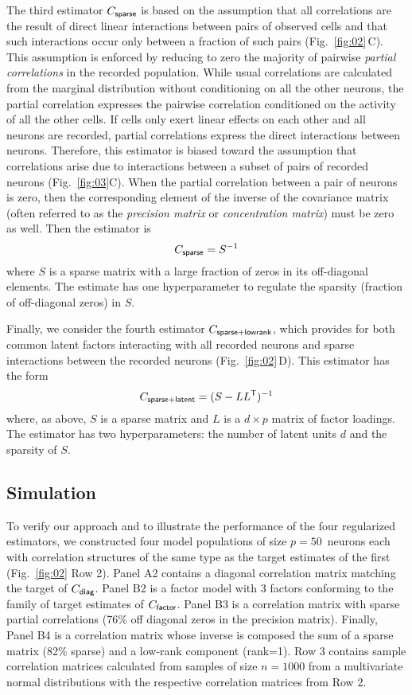 \documentclass[10pt]{article}
\newcommand{\T}{{\sf T}}
\begin{document}
The third estimator $C_{\sf sparse}$ is based on the assumption that all correlations are the result of direct linear interactions between pairs of observed cells and that such interactions occur only between a fraction of such pairs (Fig.~\ref{fig:02}\,C).
This assumption is enforced by reducing to zero the majority of pairwise \emph{partial correlations} in the recorded population. 
While usual correlations are calculated from the marginal distribution without conditioning on all the other neurons, the partial correlation expresses the pairwise correlation conditioned on the activity of all the other cells.  
If cells only exert linear effects on each other and all neurons are recorded, partial correlations express the direct interactions between neurons. 
Therefore, this estimator is biased toward the assumption that correlations arise due to interactions between a subset of pairs of recorded neurons (Fig.~\ref{fig:03}C). When the partial correlation between a pair of neurons is zero, then the corresponding element of the inverse of the covariance matrix (often referred to as the \emph{precision matrix} or \emph{concentration matrix}) must be zero as well. Then the estimator is 
\begin{equation}
C_{\sf sparse} = S^{-1}
\end{equation}
where $S$ is a sparse matrix with a large fraction of zeros in its off-diagonal elements. The estimate has one hyperparameter to regulate the sparsity (fraction of off-diagonal zeros) in $S$.

Finally, we consider the fourth estimator $C_{\sf sparse+lowrank}$, which provides for both common latent factors interacting with all recorded neurons and sparse interactions between the recorded neurons (Fig.~\ref{fig:02}\,D). This estimator has the form \cite{Chandrasekaran:2010,Ma:2013}
\begin{equation}
C_{\sf sparse+latent} = (S - LL^\T)^{-1}
\end{equation}
where, as above, $S$ is a sparse matrix and $L$ is a $d\times p$ matrix of factor loadings. The estimator has two hyperparameters: the number of latent units $d$ and the sparsity of $S$.

\subsection*{Simulation}
To verify our approach and to illustrate the performance of the four regularized estimators, we constructed four model populations of size $p=50$~neurons each with correlation structures of the same type as the target estimates of the first (Fig.~\ref{fig:02} Row 2). Panel A2 contains a diagonal correlation matrix matching the target of $C_{\sf diag}$. Panel B2 is a factor model with 3 factors conforming to the family of target estimates of $C_{\sf factor}$. Panel B3 is a correlation matrix with sparse partial correlations (76\% off diagonal zeros in the precision matrix). Finally, Panel B4 is a correlation matrix whose inverse is composed the sum of a sparse matrix (82\% sparse) and a low-rank component (rank=1).
Row 3 contains sample correlation matrices calculated from samples of size $n=1000$ from a multivariate normal distributions with the respective correlation matrices from Row 2.
\end{document}
